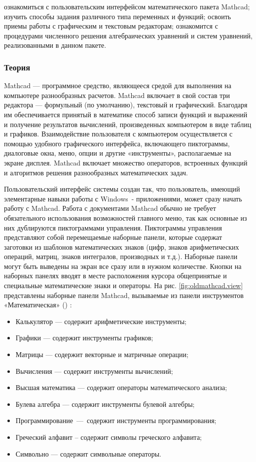 
\goal ознакомиться с пользовательским интерфейсом математического пакета Mathcad; изучить способы задания различного типа переменных и функций; освоить приемы работы с графическим и текстовым редакторам; ознакомится с процедурами численного решения алгебраических уравнений и систем уравнений, реализованными в данном пакете.

\subsubsection*{Теория}
Mathcad --- программное средство, являющееся средой для выполнения на компьютере разнообразных расчетов. Mathcad включает в свой состав три редактора --- формульный (по умолчанию), текстовый и графический. Благодаря им обеспечивается принятый в математике способ записи функций и выражений и получение результатов вычислений, произведенных компьютером в виде таблиц и графиков. Взаимодействие пользователя с компьютером осуществляется с помощью удобного графического интерфейса, включающего пиктограммы, диалоговые окна, меню, опции и другие «инструменты», располагаемые на экране дисплея. Mathcad включает множество операторов, встроенных функций и алгоритмов решения разнообразных математических задач.

Пользовательский интерфейс системы создан так, что пользователь, имеющий элементарные навыки работы с Windows~- приложениями, может сразу начать работу с Mathcad. Работа с документами Mathcad обычно не требует обязательного использования возможностей главного меню, так как основные из них дублируются пиктограммами управления. Пиктограммы управления представляют собой перемещаемые наборные панели, которые содержат заготовки из шаблонов математических знаков (цифр, знаков арифметических операций, матриц, знаков интегралов, производных и т.д.). Наборные панели могут быть выведены на экран все сразу или в нужном количестве. Кнопки на наборных панелях вводят в месте расположения курсора общепринятые и специальные математические знаки и операторы. На рис. \ref{fig:oldmathcad.view} представлены наборные панели Mathcad, вызываемые из панели инструментов «Математическая» () :
\begin{itemize}
\item Калькулятор --- содержит арифметические инструменты;
\item Графики --- содержит инструменты графиков;
\item Матрицы --- содержит векторные и матричные операции;
\item Вычисления --- содержит инструменты вычислений;
\item Высшая математика --- содержит операторы математического анализа;
\item Булева алгебра --- содержит инструменты булевой алгебры;
\item Программирование --- содержит инструменты программирования;
\item Греческий алфавит – содержит символы греческого алфавита;
\item Символьно --- содержит символьные операторы.
\end{itemize}

